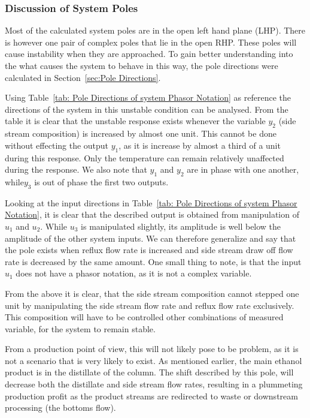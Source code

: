 \subsubsection{Discussion of System Poles}

Most of the calculated system poles are in the open left hand plane (LHP). There is however one pair of complex poles that lie in the open RHP. These poles will cause instability when they are approached. To gain better understanding into the what causes the system to behave in this way, the pole directions were calculated in Section~\ref{sec:Pole Directions}. 

Using Table~\ref{tab: Pole Directions of system Phasor Notation} as reference the directions of the system in this unstable condition can be analysed. From the table it is clear that the unstable response exists whenever the variable $y_2$ (side stream composition) is increased by almost one unit. This cannot be done without effecting the output $y_1$, as it is increase by almost a third of a unit during this response. Only the temperature can remain relatively unaffected during the response. We also note that $y_1$ and $y_2$ are in phase with one another, while$y_3$ is out of phase the first two outputs.

Looking at the input directions in Table~\ref{tab: Pole Directions of system Phasor Notation}, it is clear that the described output is obtained from manipulation of $u_1$ and $u_2$. While $u_3$ is manipulated slightly, its amplitude is well below the amplitude of the other system inputs. We can therefore generalize and say that the pole exists when reflux flow rate is increased and side stream draw off flow rate is decreased by the same amount. One small thing to note, is that the input $u_1$ does not have a phasor notation, as it is not a complex variable.

From the above it is clear, that the side stream composition cannot stepped one unit by manipulating the side stream flow rate and reflux flow rate exclusively. This composition will have to be controlled other combinations of measured variable, for the system to remain stable.

From a production point of view, this will not likely pose to be problem, as it is not a scenario that is very likely to exist. As mentioned earlier, the main ethanol product is in the distillate of the column. The shift described by this pole, will decrease both the distillate and side stream flow rates, resulting in a plummeting production profit as the product streams are redirected to waste or downstream processing (the bottoms flow).
 

